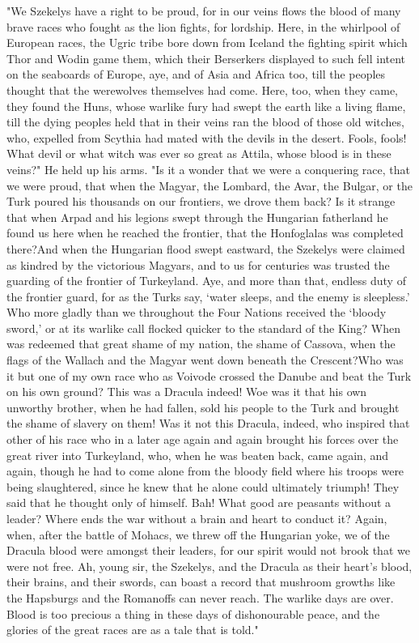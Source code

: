 "We Szekelys have a right to be proud, for in our veins flows the blood of many brave races who fought as the lion fights, for lordship. Here, in the whirlpool of European races, the Ugric tribe bore down from Iceland the fighting spirit which Thor and Wodin game them, which their Berserkers displayed to such fell intent on the seaboards of Europe, aye, and of Asia and Africa too, till the peoples thought that the werewolves themselves had come. Here, too, when they came, they found the Huns, whose warlike fury had swept the earth like a living flame, till the dying peoples held that in their veins ran the blood of those old witches, who, expelled from Scythia had mated with the devils in the desert. Fools, fools! What devil or what witch was ever so great as Attila, whose blood is in these veins?" He held up his arms. "Is it a wonder that we were a conquering race, that we were proud, that when the Magyar, the Lombard, the Avar, the Bulgar, or the Turk poured his thousands on our frontiers, we drove them back? Is it strange that when Arpad and his legions swept through the Hungarian fatherland he found us here when he reached the frontier, that the Honfoglalas was completed there?And when the Hungarian flood swept eastward, the Szekelys were claimed as kindred by the victorious Magyars, and to us for centuries was trusted the guarding of the frontier of Turkeyland. Aye, and more than that, endless duty of the frontier guard, for as the Turks say, `water sleeps, and the enemy is sleepless.' Who more gladly than we throughout the Four Nations received the `bloody sword,' or at its warlike call flocked quicker to the standard of the King? When was redeemed that great shame of my nation, the shame of Cassova, when the flags of the Wallach and the Magyar went down beneath the Crescent?Who was it but one of my own race who as Voivode crossed the Danube and beat the Turk on his own ground? This was a Dracula indeed! Woe was it that his own unworthy brother, when he had fallen, sold his people to the Turk and brought the shame of slavery on them! Was it not this Dracula, indeed, who inspired that other of his race who in a later age again and again brought his forces over the great river into Turkeyland, who, when he was beaten back, came again, and again, though he had to come alone from the bloody field where his troops were being slaughtered, since he knew that he alone could ultimately triumph! They said that he thought only of himself. Bah! What good are peasants without a leader? Where ends the war without a brain and heart to conduct it? Again, when, after the battle of Mohacs, we threw off the Hungarian yoke, we of the Dracula blood were amongst their leaders, for our spirit would not brook that we were not free. Ah, young sir, the Szekelys, and the Dracula as their heart's blood, their brains, and their swords, can boast a record that mushroom growths like the Hapsburgs and the Romanoffs can never reach. The warlike days are over. Blood is too precious a thing in these days of dishonourable peace, and the glories of the great races are as a tale that is told." 

